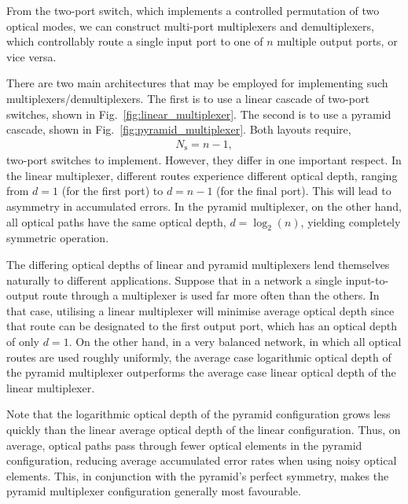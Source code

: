 From the two-port switch, which implements a controlled permutation of two optical modes, we can construct multi-port multiplexers and demultiplexers, which controllably route a single input port to one of $n$ multiple output ports, or vice versa.

There are two main architectures that may be employed for implementing such multiplexers/demultiplexers. The first is to use a linear cascade of two-port switches, shown in Fig.~\ref{fig:linear_multiplexer}. The second is to use a pyramid cascade, shown in Fig.~\ref{fig:pyramid_multiplexer}. Both layouts require,
\begin{align}
N_\mathrm{s} = n-1,
\end{align}
two-port switches to implement. However, they differ in one important respect. In the linear multiplexer, different routes experience different optical depth, ranging from \mbox{$d=1$} (for the first port) to \mbox{$d=n-1$} (for the final port). This will lead to asymmetry in accumulated errors. In the pyramid multiplexer, on the other hand, all optical paths have the same optical depth, \mbox{$d=\log_2(n)$}, yielding completely symmetric operation.

The differing optical depths of linear and pyramid multiplexers lend themselves naturally to different applications. Suppose that in a network a single input-to-output route through a multiplexer is used far more often than the others. In that case, utilising a linear multiplexer will minimise average optical depth since that route can be designated to the first output port, which has an optical depth of only \mbox{$d=1$}. On the other hand, in a very balanced network, in which all optical routes are used roughly uniformly, the average case logarithmic optical depth of the pyramid multiplexer outperforms the average case linear optical depth of the linear multiplexer.

Note that the logarithmic optical depth of the pyramid configuration grows less quickly than the linear average optical depth of the linear configuration. Thus, on average, optical paths pass through fewer optical elements in the pyramid configuration, reducing average accumulated error rates when using noisy optical elements. This, in conjunction with the pyramid's perfect symmetry, makes the pyramid multiplexer configuration generally most favourable.

